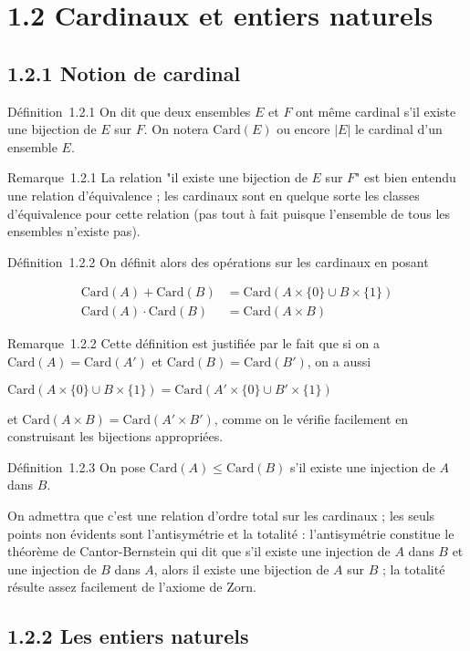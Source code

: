 \section{1.2 Cardinaux et entiers naturels}

\subsection{1.2.1 Notion de cardinal}

Définition~1.2.1 On dit que deux ensembles $E$ et $F$ ont même cardinal s'il
existe une bijection de $E$ sur $F$. On notera
$\text{Card}(E)$ ou encore $|E|$ le
cardinal d'un ensemble $E$.

Remarque~1.2.1 La relation "il existe une bijection de $E$ sur $F$" est bien
entendu une relation d'équivalence ; les cardinaux sont en quelque sorte
les classes d'équivalence pour cette relation (pas tout à fait puisque
l'ensemble de tous les ensembles n'existe pas).

Définition~1.2.2 On définit alors des opérations sur les cardinaux en
posant

\begin{align*} 
\text{Card}(A) + \text{Card}(B) &= \text{Card}(A \times \{0\} \cup B \times \{1\}) \\
\text{Card}(A) \cdot \text{Card}(B) &= \text{Card}(A \times B)
\end{align*}

Remarque~1.2.2 Cette définition est justifiée par le fait que si on a
$\text{Card}(A) = \text{Card}(A')$ et
$\text{Card}(B) = \text{Card}(B')$, on a
aussi

$\text{Card}(A \times \{0\} \cup B \times \{1\}) = \text{Card}(A' \times \{0\} \cup B' \times \{1\})$

et $\text{Card}(A \times B) = \text{Card}(A' \times B')$, comme on le vérifie facilement en construisant les
bijections appropriées.

Définition~1.2.3 On pose $\text{Card}(A) \leq \text{Card}(B)$ s'il existe une injection de $A$ dans $B$.

On admettra que c'est une relation d'ordre total sur les cardinaux ; les
seuls points non évidents sont l'antisymétrie et la totalité :
l'antisymétrie constitue le théorème de Cantor-Bernstein qui dit que
s'il existe une injection de $A$ dans $B$ et une injection de $B$ dans $A$,
alors il existe une bijection de $A$ sur $B$ ; la totalité résulte assez
facilement de l'axiome de Zorn.

\subsection{1.2.2 Les entiers naturels}

